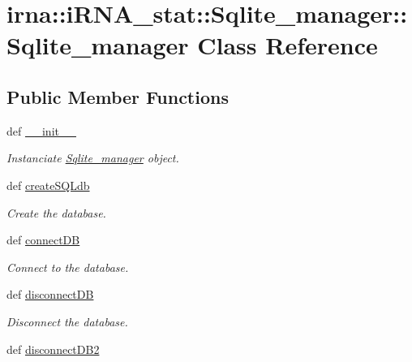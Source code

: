 \hypertarget{classirna_1_1iRNA__stat_1_1Sqlite__manager_1_1Sqlite__manager}{
\section{irna\-:\-:i\-R\-N\-A\-\_\-stat\-:\-:\-Sqlite\-\_\-manager\-:\-:\-Sqlite\-\_\-manager \-Class \-Reference}
\label{classirna_1_1iRNA__stat_1_1Sqlite__manager_1_1Sqlite__manager}
}
\subsection*{\-Public \-Member \-Functions}
\begin{DoxyCompactItemize}
\item 
def \hyperlink{classirna_1_1iRNA__stat_1_1Sqlite__manager_1_1Sqlite__manager_a6dc904f8bab037c13df71b0c20acf0d3}{\-\_\-\-\_\-init\-\_\-\-\_\-}
\begin{DoxyCompactList}\small\item\em \-Instanciate \hyperlink{classirna_1_1iRNA__stat_1_1Sqlite__manager_1_1Sqlite__manager}{\-Sqlite\-\_\-manager} object. \end{DoxyCompactList}\item 
def \hyperlink{classirna_1_1iRNA__stat_1_1Sqlite__manager_1_1Sqlite__manager_a4ba7623ffe0d93c88e9edab289f64f69}{create\-S\-Q\-Ldb}
\begin{DoxyCompactList}\small\item\em \-Create the database. \end{DoxyCompactList}\item 
def \hyperlink{classirna_1_1iRNA__stat_1_1Sqlite__manager_1_1Sqlite__manager_a7dc95459b5d7f7eab9419134fc1fa0b1}{connect\-D\-B}
\begin{DoxyCompactList}\small\item\em \-Connect to the database. \end{DoxyCompactList}\item 
def \hyperlink{classirna_1_1iRNA__stat_1_1Sqlite__manager_1_1Sqlite__manager_ae129ed32afd7e7f590571148c324f6ee}{disconnect\-D\-B}
\begin{DoxyCompactList}\small\item\em \-Disconnect the database. \end{DoxyCompactList}\item 
def \hyperlink{classirna_1_1iRNA__stat_1_1Sqlite__manager_1_1Sqlite__manager_a9c79d963f7afd3346b77953ccb3d3c73}{disconnect\-D\-B2}

\end{DoxyCompactItemize}
